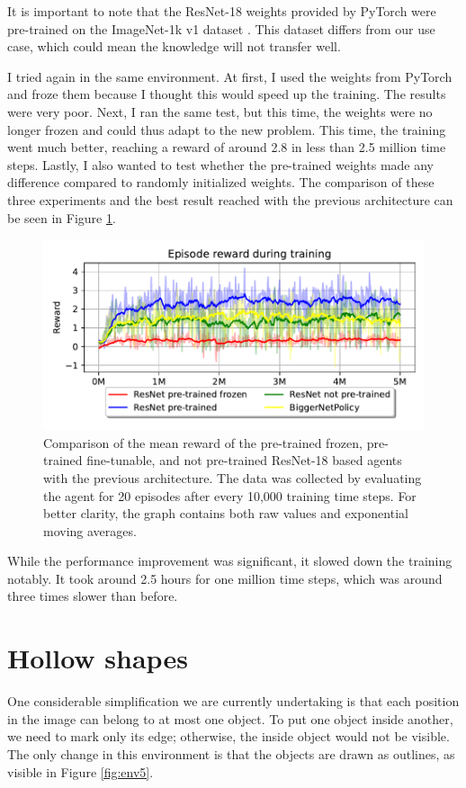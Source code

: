 \documentclass[
  digital,     %
  oneside,     %
  nosansbold,  %
  nocolorbold, %
  lof,         %
  lot,         %
]{fithesis4}
\begin{document}
It is important to note that the ResNet-18 weights provided by PyTorch were pre-trained on the ImageNet-1k v1 dataset \cite{torchvision2016}. This dataset differs from our use case, which could mean the knowledge will not transfer well.

I tried again in the same environment. At first, I used the weights from PyTorch and froze them because I thought this would speed up the training. The results were very poor. Next, I ran the same test, but this time, the weights were no longer frozen and could thus adapt to the new problem. This time, the training went much better, reaching a reward of around 2.8 in less than 2.5 million time steps. Lastly, I also wanted to test whether the pre-trained weights made any difference compared to randomly initialized weights. The comparison of these three experiments and the best result reached with the previous architecture can be seen in Figure \ref{fig:v4_resnet_graph}. 

\begin{figure}
    \includegraphics[width=1\linewidth]{graphs/v4_resnet_graph.pdf}
    \caption{Comparison of the mean reward of the pre-trained frozen, pre-trained fine-tunable, and not pre-trained ResNet-18 based agents with the previous architecture. The data was collected by evaluating the agent for 20 episodes after every 10,000 training time steps. For better clarity, the graph contains both raw values and exponential moving averages.}
    \label{fig:v4_resnet_graph}
\end{figure}

While the performance improvement was significant, it slowed down the training notably. It took around 2.5 hours for one million time steps, which was around three times slower than before.

\section{Hollow shapes}
One considerable simplification we are currently undertaking is that each position in the image can belong to at most one object. To put one object inside another, we need to mark only its edge; otherwise, the inside object would not be visible. The only change in this environment is that the objects are drawn as outlines, as visible in Figure \ref{fig:env5}.
\end{document}
